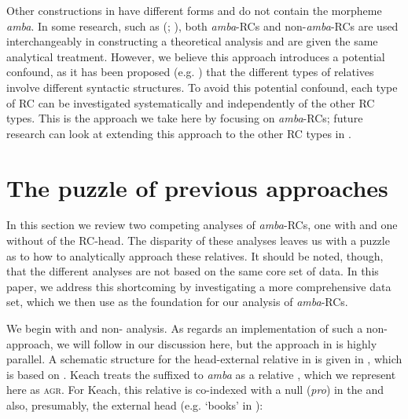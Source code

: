 \documentclass[output=paper,modfonts,nonflat,
colorlinks, citecolor=brown,
]{langsci/langscibook}
\begin{document}

Other  constructions in  have different forms and do not contain the morpheme \textit{amba}. In some research, such as \citeauthor{Ngonyani2001} (\citeyear{Ngonyani2001}; \citeyear{Ngonyani2006}), both \textit{amba}{}-RCs and non-\textit{amba}{}-RCs are used interchangeably in constructing a theoretical analysis and are given the same analytical treatment. However, we believe this approach introduces a potential confound, as it has been proposed (e.g. \citealt{Barrett-Keach1985}) that the different types of  relatives involve different syntactic structures. To avoid this potential confound, each type of RC can be investigated systematically and independently of the other RC types. This is the approach we take here by focusing on \textit{amba}{}-RCs; future research can look at extending this approach to the other RC types in . 

\section{The puzzle of previous approaches}\label{sec:gould:3}
 
In this section we review two competing analyses of \textit{amba}{}-RCs, one with and one without  of the RC-head. The disparity of these analyses leaves us with a puzzle as to how to analytically approach these relatives. It should be noted, though, that the different analyses are not based on the same core set of data. In this paper, we address this shortcoming by investigating a more comprehensive data set, which we then use as the foundation for our analysis of \textit{amba}{}-RCs.

We begin with  and  non- analysis. As regards an implementation of such a non- approach, we will follow \citet{Keach2004} in our discussion here, but the approach in \citet{Barrett-Keach1985} is highly parallel. A schematic structure for the head-external relative in  is given in , which is based on \citet[126]{Keach2004}. Keach treats the  suffixed to \textit{amba} as a relative , which we represent here as \textsc{agr}. For Keach, this relative  is co-indexed with a null  (\textit{pro}) in the  and also, presumably, the external head (e.g. ‘books’ in ):
\end{document}
